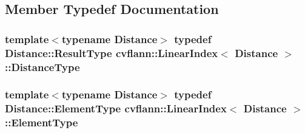 \subsection{Member Typedef Documentation}
\hypertarget{classcvflann_1_1LinearIndex_a2856b8b90987bac8737fdb08b5ad693f}{
\subsubsection[{Distance\-Type}]{\setlength{\rightskip}{0pt plus 5cm}template$<$typename Distance$>$ typedef Distance\-::\-Result\-Type {\bf cvflann\-::\-Linear\-Index}$<$ Distance $>$\-::{\bf Distance\-Type}}}\label{classcvflann_1_1LinearIndex_a2856b8b90987bac8737fdb08b5ad693f}
\hypertarget{classcvflann_1_1LinearIndex_a7a42eebeec43b6f10fd8e2ffb6516959}{
\subsubsection[{Element\-Type}]{\setlength{\rightskip}{0pt plus 5cm}template$<$typename Distance$>$ typedef Distance\-::\-Element\-Type {\bf cvflann\-::\-Linear\-Index}$<$ Distance $>$\-::{\bf Element\-Type}}}\label{classcvflann_1_1LinearIndex_a7a42eebeec43b6f10fd8e2ffb6516959}


